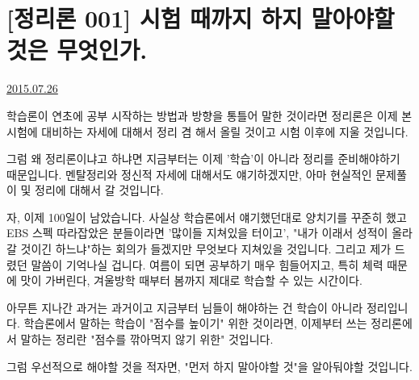 
\section{[정리론 001] 시험 때까지 하지 말아야할 것은 무엇인가.}
\href{https://www.kockoc.com/Apoc/215719}{2015.07.26}

\vspace{5mm}

학습론이 연초에 공부 시작하는 방법과 방향을 통틀어 말한 것이라면
정리론은 이제 본 시험에 대비하는 자세에 대해서 정리 겸 해서 올릴 것이고 시험 이후에 지울 것입니다.
\vspace{5mm}

그럼 왜 정리론이냐고 하냐면 지금부터는 이제 '학습'이 아니라 정리를 준비해야하기 때문입니다.
멘탈정리와 정신적 자세에 대해서도 얘기하겠지만, 아마 현실적인 문제풀이 및 정리에 대해서 갈 것입니다.
\vspace{5mm}

자, 이제 100일이 남았습니다. 사실상 학습론에서 얘기했던대로 양치기를 꾸준히 했고 EBS 스펙 따라잡았은 분들이라면
'많이들 지쳐있을 터이고', "내가 이래서 성적이 올라갈 것이긴 하느냐"하는 회의가 들겠지만 무엇보다 지쳐있을 것입니다.
그리고 제가 드렸던 말씀이 기억나실 겁니다. 여름이 되면 공부하기 매우 힘들어지고, 특히 체력 때문에 맛이 가버린다,
겨울방학 때부터 봄까지 제대로 학습할 수 있는 시간이다.
\vspace{5mm}

아무튼 지나간 과거는 과거이고 지금부터 님들이 해야하는 건 학습이 아니라 정리입니다.
학습론에서 말하는 학습이 "점수를 높이기" 위한 것이라면, 이제부터 쓰는 정리론에서 말하는 정리란 "점수를 깎아먹지 않기 위한" 것입니다.
\vspace{5mm}

그럼 우선적으로 해야할 것을 적자면,  "먼저 하지 말아야할 것"을 알아둬야할 것입니다.
\vspace{5mm}


